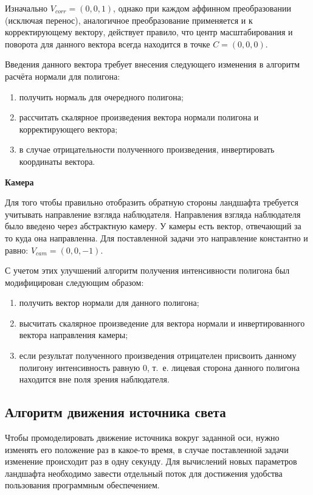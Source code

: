 Изначально $V_{corr} = (0, 0, 1)$, однако при каждом аффинном преобразовании (исключая перенос), аналогичное преобразование применяется и к корректирующему вектору, действует правило, что центр масштабирования и поворота для данного вектора всегда находится в точке $C = (0, 0, 0)$.

Введения данного вектора требует внесения следующего изменения в алгоритм расчёта нормали для полигона:

\begin{enumerate}
	\item получить нормаль для очередного полигона;
	\item рассчитать скалярное произведения вектора нормали полигона и корректирующего вектора;
	\item в случае отрицательности полученного произведения, инвертировать координаты вектора.
\end{enumerate}

{\bfseries Камера}

Для того чтобы правильно отобразить обратную стороны ландшафта требуется учитывать направление взгляда наблюдателя. Направления взгляда наблюдателя было введено через абстрактную камеру. У камеры есть вектор, отвечающий за то куда она направленна. Для поставленной задачи это направление константно и равно: $V_{cam} = (0, 0, -1)$.

С учетом этих улучшений алгоритм получения интенсивности полигона был модифицирован следующим образом:

\begin{enumerate}
	\item получить вектор нормали для данного полигона;
	\item высчитать скалярное произведение для вектора нормали и инвертированного вектора направления камеры;
	\item если результат полученного произведения отрицателен присвоить данному полигону интенсивность равную $0$, т.~е. лицевая сторона данного полигона находится вне поля зрения наблюдателя.
\end{enumerate}

\subsection{Алгоритм движения источника света}

Чтобы промоделировать движение источника вокруг заданной оси, нужно изменять его положение раз в какое-то время, в случае поставленной задачи изменение происходит раз в одну секунду. Для вычислений новых параметров ландшафта необходимо завести отдельный поток для достижения удобства пользования программным обеспечением.

